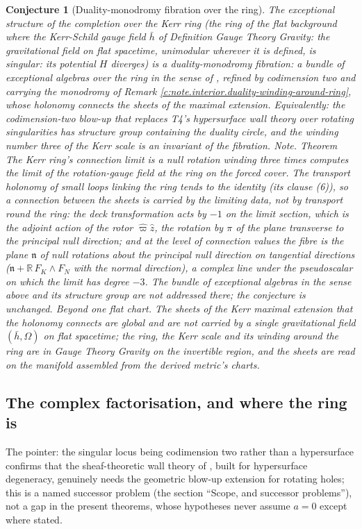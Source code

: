 \documentclass[11pt]{article}
\newtheorem{conjecture}[theorem]{Conjecture}
\theoremstyle{definition}
\theoremstyle{plain}
\newcommand{\changedmark}[2]{\marginpar{\raggedright\scriptsize\color{#1}#2}}
\providecommand{\R}{}\renewcommand{\R}{\mathbb{R}}
\providecommand{\hb}{}\renewcommand{\hb}{\bar{h}}
\begin{document}
\begin{conjecture}[Duality-monodromy fibration over the ring]\label{c:interior.duality-monodromy-fibration-over-ring}
\changedmark{BurntOrange}{changed since the deposit}
The exceptional structure of the completion over the Kerr ring (the ring of the flat background where the Kerr-Schild gauge field $\hb$ of Definition \emph{Gauge Theory Gravity: the gravitational field on flat spacetime}, unimodular wherever it is defined, is singular: its potential $H$ diverges) is a duality-monodromy fibration: a bundle of exceptional algebras over the ring in the sense of \cite[Prop.~6.1]{ButlerT4}, refined by codimension two and carrying the monodromy of Remark \ref{c:note.interior.duality-winding-around-ring}, whose holonomy connects the sheets of the maximal extension. Equivalently: the codimension-two blow-up that replaces T4's hypersurface wall theory over rotating singularities has structure group containing the duality circle, and the winding number three of the Kerr scale is an invariant of the fibration. \emph{Note.} Theorem \emph{The Kerr ring's connection limit is a null rotation winding three times} computes the limit of the rotation-gauge field at the ring on the forced cover. The transport holonomy of small loops linking the ring tends to the identity (its clause (6)), so a connection between the sheets is carried by the limiting data, not by transport round the ring: the deck transformation acts by $-1$ on the limit section, which is the adjoint action of the rotor $\hat\varpi\hat z$, the rotation by $\pi$ of the plane transverse to the principal null direction; and at the level of connection values the fibre is the plane $\mathfrak n$ of null rotations about the principal null direction on tangential directions ($\mathfrak n + \R\,F_K \wedge F_N$ with the normal direction), a complex line under the pseudoscalar on which the limit has degree $-3$. The bundle of exceptional algebras in the sense above and its structure group are not addressed there; the conjecture is unchanged. \emph{Beyond one flat chart.} The sheets of the Kerr maximal extension that the holonomy connects are global and are not carried by a single gravitational field $(\hb, \Omega)$ on flat spacetime; the ring, the Kerr scale and its winding around the ring are in Gauge Theory Gravity on the invertible region, and the sheets are read on the manifold assembled from the derived metric's charts.
\end{conjecture}

\subsection*{The complex factorisation, and where the ring is}
\label{c:note.interior.setting-complex-factorisation-where-ring}
The pointer: the singular locus being codimension two rather than a hypersurface confirms that the sheaf-theoretic wall theory of \cite{ButlerT4}, built for hypersurface degeneracy, genuinely needs the geometric blow-up extension for rotating holes; this is a named successor problem (the section ``Scope, and successor problems''), not a gap in the present theorems, whose hypotheses never assume $a = 0$ except where stated.
\end{document}
